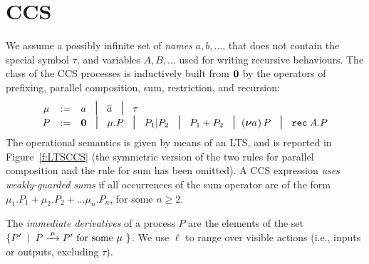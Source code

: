 
\section{CCS}
\label{ss:ccs}


We assume  a possibly infinite set of \emph{names} $a, b,
\ldots$, that does not contain the special symbol $\tau$, and
variables $A,B, \ldots$ used for writing recursive behaviours. 
The class  of the CCS processes is inductively built from ${\boldsymbol 0}$ by the operators
of  prefixing, parallel composition,  sum,
 restriction,  and recursion:
\begin{equation*}
\begin{array}{ccl}
\mu  & := &  a \; \midd \;  \outC a  \; \midd \;  \tau \\
P  & := &  \nil \; \midd \;  \mu . P \; \midd \;  P_1 |  P_2 \; \midd  \;
P_1 + P_2 \; \midd %
  (\res a\!)\, P  \;  \midd \;   \recu A  P   %
\end{array}
\end{equation*}
The operational semantics is given by means of an LTS, and is
reported in Figure~\ref{f:LTSCCS} (the symmetric version  of the two rules for
parallel composition and the rule for sum  has been omitted).
A CCS expression \emph{uses weakly-guarded sums} if all occurrences of
the sum  operator are of the form $\mu_1.P_1 + \mu_2.P_2 + \ldots
\mu_n.P_n$, for some $n \geq 2$. 

 The \emph{immediate derivatives} of a
process $P$ are the elements of  the set $\{P' \st P \arr\mu P' \mbox{ for some $\mu$ }
\}$.   
We use $\ell$ to range over
 visible actions (i.e.,  inputs or outputs, excluding  $\tau$).

